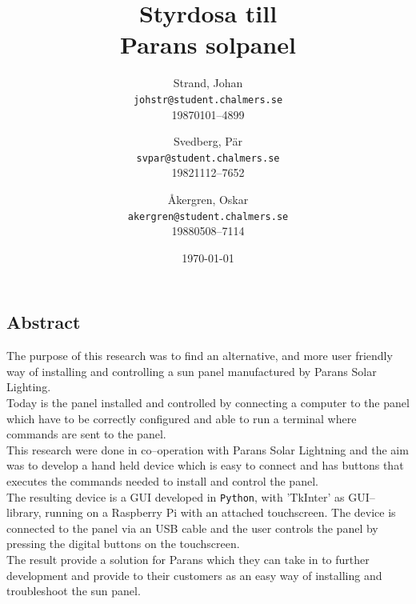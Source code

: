 \documentclass{article}
\author{    Strand, Johan \\ \texttt{johstr@student.chalmers.se} \\ 
            19870101--4899 \and
            Svedberg, Pär\\ \texttt{svpar@student.chalmers.se}  \\ 
            19821112--7652 \and
            Åkergren, Oskar\\ \texttt{akergren@student.chalmers.se}  \\ 19880508--7114
}
\title{\vspace{2cm} Styrdosa till \\ Parans solpanel  \vspace{1cm}}
\date{\vspace{8cm}\today}
\begin{document}
    \maketitle
    \thispagestyle{empty}

    \newpage 
    \subsection*{Abstract} %
    \label{sub:abstract}
            The purpose of this research was to find an alternative, and more user friendly way of installing and controlling a sun panel manufactured by Parans Solar Lighting. \\

            \noindent Today is the panel installed and controlled by connecting a computer to the panel which have to be correctly configured and able to run a terminal where commands are sent to the panel.\\

            \noindent This research were done in co--operation with Parans Solar Lightning and the aim was to develop a hand held device which is easy to connect and has buttons that executes the commands needed to install and control the panel.\\

            \noindent The resulting device is a GUI developed in \texttt{Python}, with 'TkInter' as GUI--library, running on a Raspberry Pi with an attached touchscreen. The device is connected to the panel via an USB cable and the user controls the panel by pressing the digital buttons on the touchscreen.\\

            \noindent The result provide a solution for Parans which they can take in to further development and provide to their customers as an easy way of installing and troubleshoot the sun panel.

    \newpage 
\end{document}
